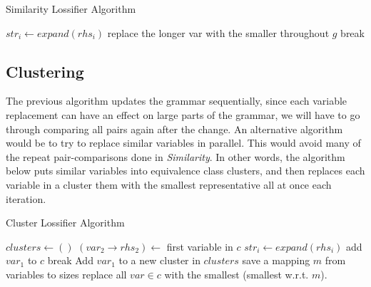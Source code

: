 \documentclass[11pt]{article}
\begin{document}
\begin{algorithm}[h]
\caption{Similarity Lossifier Algorithm}
\label{sim_alg}
\begin{algorithmic}[1]
 
      \State $str_{i} \gets expand(rhs_i)$
        \State replace the longer var with the smaller throughout $g$
        \State break
      \EndIf
    \EndFor
  \EndWhile
\EndProcedure
\end{algorithmic}
\end{algorithm}

\subsection{Clustering}

The previous algorithm updates the grammar sequentially, since each
variable replacement can have an effect on large parts of the grammar,
we will have to go through comparing all pairs again after the change.
An alternative algorithm would be to try to replace similar variables in
parallel. This would avoid many of the repeat pair-comparisons done in
\emph{Similarity}. In other words, the algorithm below puts 
similar variables
into equivalence class clusters, and then replaces each variable
in a cluster them with the smallest representative
all at once each iteration.

\begin{algorithm}[h]
\caption{Cluster Lossifier Algorithm}
\label{cluster_alg}
\begin{algorithmic}[1]
 
    \State $clusters \gets ()$
        \State $(var_2 \rightarrow rhs_2) \gets $ first variable in $c$
        \State $str_{i} \gets expand(rhs_i)$
          \State add $var_1$ to $c$
          \State break
        \EndIf
      \EndFor
        \State Add $var_1$ to a new cluster in $clusters$
      \EndIf
    \EndFor
    \State save a mapping $m$ from variables to sizes
      \State replace all $var \in c$ with the smallest (smallest w.r.t. $m$).
    \EndFor
  \EndWhile
\EndProcedure
\end{algorithmic}
\end{algorithm}
\end{document}
